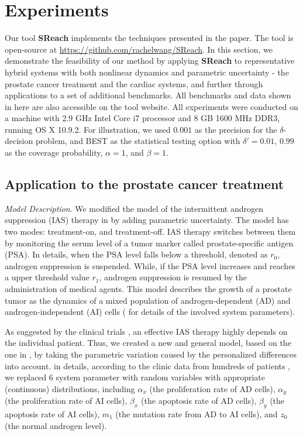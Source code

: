 \section{Experiments}

Our tool {\bf SReach} implements the techniques presented in the paper. The tool is open-source at \url{https://github.com/rachelwang/SReach}. In this section, we demonstrate the feasibility of our method by applying {\bf SReach} to representative hybrid systems with both nonlinear dynamics and parametric uncertainty - the prostate cancer treatment and the cardiac systems, and further through applications to a set of additional benchmarks. All benchmarks and data shown in here are also accessible on the tool website. All experiments were conducted on a machine with 2.9 GHz Intel Core i7 processor and 8 GB 1600 MHz DDR3, running OS X 10.9.2. For illustration, we used $0.001$ as the precision for the $\delta$-decision problem, and BEST as the statistical testing option with $\delta' = 0.01$, $0.99$ as the coverage probability, $\alpha = 1$, and $\beta = 1$. 


\subsection{Application to the prostate cancer treatment}

\textit{Model Description}.
We modified the model of the intermittent androgen suppression (IAS) therapy in \cite{tanaka2010mathematical} by adding parametric uncertainty. The model has two modes: treatment-on, and treatment-off. IAS therapy switches between them by monitoring the serum level of a tumor marker called prostate-specific antigen (PSA). In details, when the PSA level falls below a threshold, denoted as $r_0$, androgen suppression is suspended. While, if the PSA level increases and reaches a upper threshold value $r_1$, androgen suppression is resumed by the administration of medical agents. This model describes the growth of a prostate tumor as the dynamics of a mixed population of androgen-dependent (AD) and androgen-independent (AI) cells (\cite{tanaka2010mathematical} for details of the involved system parameters). 

As suggested by the clinical trials \cite{bruchovsky2006final}, an effective IAS therapy highly depends on the individual patient. Thus, we created a new and general model, based on the one in \cite{tanaka2010mathematical},  by taking the parametric variation caused by the personalized differences into account. in details, according to the clinic data from hundreds of patients \cite{bruchovsky2007locally}, we replaced 6 system parameter with random variables with appropriate (continuous) distributions, including $\alpha_x$ (the proliferation rate of AD cells), $\alpha_y$ (the proliferation rate of AI cells), $\beta_x$ (the apoptosis rate of AD cells), $\beta_y$ (the apoptosis rate of AI cells), $m_1$ (the mutation rate from AD to AI cells), and $z_0$ (the normal androgen level).

